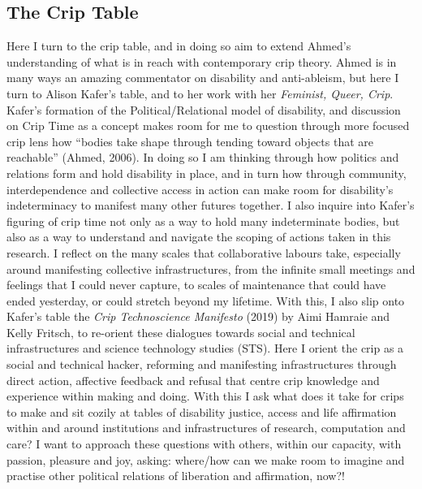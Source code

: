 \hypertarget{the-crip-table}{%
\subsection[The Crip
Table]{\texorpdfstring{\protect\hypertarget{anchor}{}{}The Crip
Table}{The Crip Table}}\label{the-crip-table}}

Here I turn to the crip table, and in doing so aim to extend Ahmed's
understanding of what is in reach with contemporary crip theory. Ahmed
is in many ways an amazing commentator on disability and anti-ableism,
but here I turn to Alison Kafer's table, and to her work with her
\emph{Feminist, Queer, Crip}. Kafer's formation of the
Political/Relational model of disability, and discussion on Crip Time as
a concept makes room for me to question through more focused crip lens
how ``bodies take shape through tending toward objects that are
reachable'' (Ahmed, 2006). In doing so I am thinking through how
politics and relations form and hold disability in place, and in turn
how through community, interdependence and collective access in action
can make room for disability's indeterminacy to manifest many other
futures together. I also inquire into Kafer's figuring of crip time not
only as a way to hold many indeterminate bodies, but also as a way to
understand and navigate the scoping of actions taken in this research. I
reflect on the many scales that collaborative labours take, especially
around manifesting collective infrastructures, from the infinite small
meetings and feelings that I could never capture, to scales of
maintenance that could have ended yesterday, or could stretch beyond my
lifetime. With this, I also slip onto Kafer's table the \emph{Crip
Technoscience Manifesto} (2019) by Aimi Hamraie and Kelly Fritsch, to
re-orient these dialogues towards social and technical infrastructures
and science technology studies (STS). Here I orient the crip as a social
and technical hacker, reforming and manifesting infrastructures through
direct action, affective feedback and refusal that centre crip knowledge
and experience within making and doing. With this I ask what does it
take for crips to make and sit cozily at tables of disability justice,
access and life affirmation within and around institutions and
infrastructures of research, computation and care? I want to approach
these questions with others, within our capacity, with passion, pleasure
and joy, asking: where/how can we make room to imagine and practise
other political relations of liberation and affirmation, now?!

